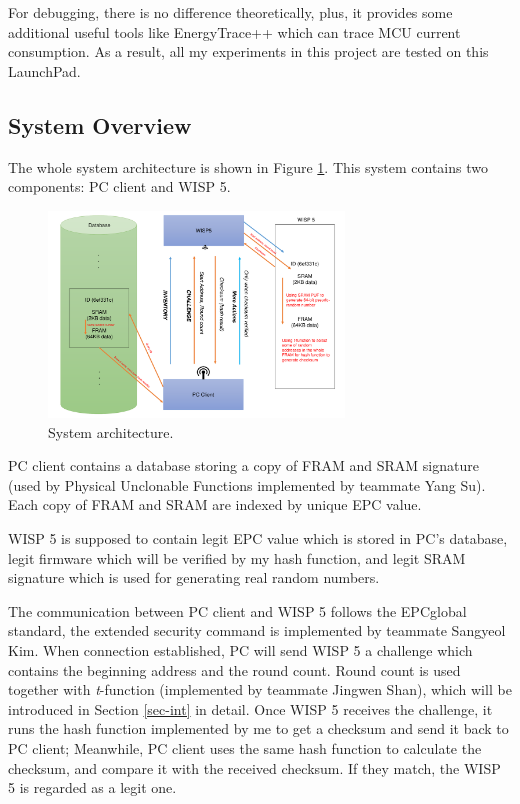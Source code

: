 \documentclass[sigconf, review=false]{acmart}
\let\OldTexttrademark\texttrademark
\renewcommand{\texttrademark}{\OldTexttrademark\xspace}%
\begin{document}
For debugging, there is no difference theoretically, plus, it provides some additional useful tools
like EnergyTrace++\texttrademark which can trace MCU current consumption.
As a result, all my experiments in this project are tested on this LaunchPad.

\subsection{System Overview}
The whole system architecture is shown in Figure \ref{fig-arch}.
This system contains two components: PC client and WISP 5.

\begin{figure}
\centering
\includegraphics[width=0.7\textwidth]{arch.pdf}
\caption{System architecture.}
\label{fig-arch}
\end{figure}

PC client contains a database storing a copy of FRAM and SRAM signature
(used by Physical Unclonable Functions implemented by teammate Yang Su).
Each copy of FRAM and SRAM are indexed by unique EPC value.

WISP 5 is supposed to contain legit EPC value which is stored in PC's database,
legit firmware which will be verified by my hash function,
and legit SRAM signature which is used for generating real random numbers.

The communication between PC client and WISP 5 follows the EPCglobal standard,
the extended security command is implemented by teammate Sangyeol Kim.
When connection established, PC will send WISP 5 a challenge which contains the beginning address and the round count.
Round count is used together with \textit{t}-function (implemented by teammate Jingwen Shan),
which will be introduced in Section \ref{sec-int} in detail.
Once WISP 5 receives the challenge, it runs the hash function implemented by me to get a checksum and send it back to PC client;
Meanwhile, PC client uses the same hash function to calculate the checksum, and compare it with the received checksum.
If they match, the WISP 5 is regarded as a legit one.
\end{document}
